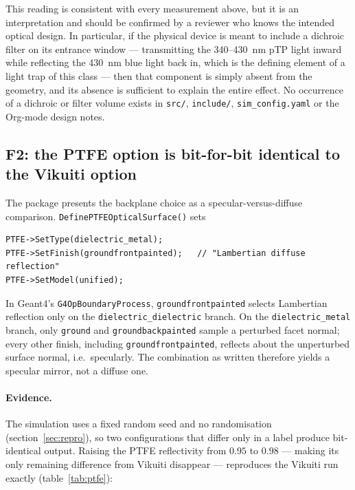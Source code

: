 \documentclass[a4paper,11pt]{article}
\begin{document}
This reading is consistent with every measurement above, but it is an
interpretation and should be confirmed by a reviewer who knows the intended
optical design. In particular, if the physical device is meant to include a
dichroic filter on its entrance window --- transmitting the \SI{340}{}--\SI{430}{\nano\meter}
pTP light inward while reflecting the \SI{430}{\nano\meter} blue light back in,
which is the defining element of a light trap of this class --- then that
component is simply absent from the geometry, and its absence is sufficient to
explain the entire effect. No occurrence of a dichroic or filter volume exists
in \texttt{src/}, \texttt{include/}, \texttt{sim\_config.yaml} or the Org-mode
design notes.

\subsection{F2: the PTFE option is bit-for-bit identical to the Vikuiti option}
\label{sec:f2}

The package presents the backplane choice as a specular-versus-diffuse
comparison. \texttt{DefinePTFEOpticalSurface()} sets

\begin{lstlisting}
PTFE->SetType(dielectric_metal);
PTFE->SetFinish(groundfrontpainted);   // "Lambertian diffuse reflection"
PTFE->SetModel(unified);
\end{lstlisting}

In Geant4's \texttt{G4OpBoundaryProcess}, \texttt{groundfrontpainted} selects
Lambertian reflection only on the \texttt{dielectric\_dielectric} branch. On the
\texttt{dielectric\_metal} branch, only \texttt{ground} and
\texttt{groundbackpainted} sample a perturbed facet normal; every other finish,
including \texttt{groundfrontpainted}, reflects about the unperturbed surface
normal, i.e.\ specularly. The combination as written therefore yields a specular
mirror, not a diffuse one.

\paragraph{Evidence.} The simulation uses a fixed random seed and no
randomisation (section~\ref{sec:repro}), so two configurations that differ only
in a label produce bit-identical output. Raising the PTFE reflectivity from
$0.95$ to $0.98$ --- making its only remaining difference from Vikuiti disappear
--- reproduces the Vikuiti run exactly (table~\ref{tab:ptfe}):
\end{document}
